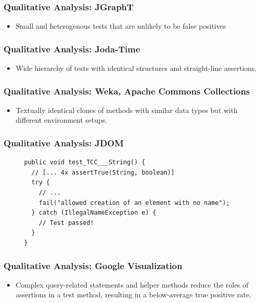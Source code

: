 \documentclass{beamer}
\begin{document}
\begin{frame}
\frametitle{Qualitative Analysis: JGraphT} {
   \Large
     \begin{itemize}
        \item Small and heterogenous tests that are unlikely to be false positives
     \end{itemize}
}
\end{frame}

\begin{frame}
\frametitle{Qualitative Analysis: Joda-Time} {
   \Large
     \begin{itemize}
        \item Wide hierarchy of tests with identical structures and straight-line assertions.
     \end{itemize}
}
\end{frame}

\begin{frame}
\frametitle{Qualitative Analysis: Weka, Apache Commons Collections} {
   \Large
   \begin{itemize}
      \item Textually identical clones of methods with similar data types
         but with different environment setups.
   \end{itemize}    
}
\end{frame}

\begin{frame}[fragile]
\frametitle{Qualitative Analysis: JDOM} {
\begin{figure}[ht!]
\begin{lstlisting}
public void test_TCC___String() {
  // [... 4x assertTrue(String, boolean)]
  try {
    // ...
    fail("allowed creation of an element with no name");
  } catch (IllegalNameException e) { 
    // Test passed!
  }
}
\end{lstlisting}
\end{figure}
}
\end{frame}

\begin{frame}
\frametitle{Qualitative Analysis: Google Visualization} {
   \Large
   \begin{itemize}
      \item Complex query-related statements and helper methods reduce
         the roles of assertions in a test method, 
         resulting in a below-average true positive rate.
   \end{itemize}    
}
\end{frame}
\end{document}

